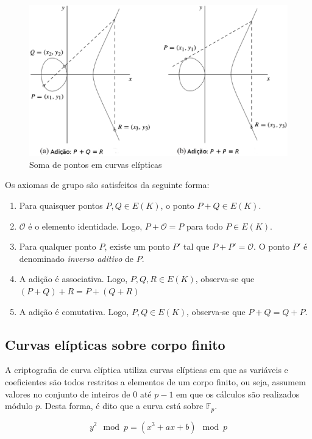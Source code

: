 \begin{figure}[h]
\includegraphics[scale=0.5, bb=0 0 484 636]{figuras/SomaECC.eps}
\caption{Soma de pontos em curvas elípticas \cite{Guide}}
\label{fig:pontos}
\end{figure}

Os axiomas de grupo são satisfeitos da seguinte forma:
\begin{enumerate}
  \item Para quaisquer pontos $P, Q \in E(K)$, o ponto $P + Q \in E(K)$.
  \item $\mathcal{O}$ é o elemento identidade. Logo, $P + \mathcal{O} = P$ para todo $P \in E(K)$.
  \item Para qualquer ponto $P$, existe um ponto $P'$ tal que $P + P' = \mathcal{O}$. O ponto $P'$ é denominado \textit{inverso aditivo} de $P$.
  \item A adição é associativa. Logo, $P, Q, R \in E(K)$, observa-se que $(P + Q) + R = P + (Q + R)$
  \item A adição é comutativa. Logo, $P, Q \in E(K)$, observa-se que $P + Q = Q + P$.
\end{enumerate}

\subsection{Curvas elípticas sobre corpo finito}
A criptografia de curva elíptica utiliza curvas elípticas em que as variáveis e coeficientes são todos restritos a elementos de um corpo finito, ou seja, assumem valores no conjunto de inteiros de 0 até $p - 1$ em que os cálculos são realizados módulo \(p\). Desta forma, é dito que a curva está sobre $\mathbb{F}_p$. \cite{Stallings:2011}

\begin{equation}
y^2 \mod p = (x^3 + ax + b) \mod p
\end{equation}

